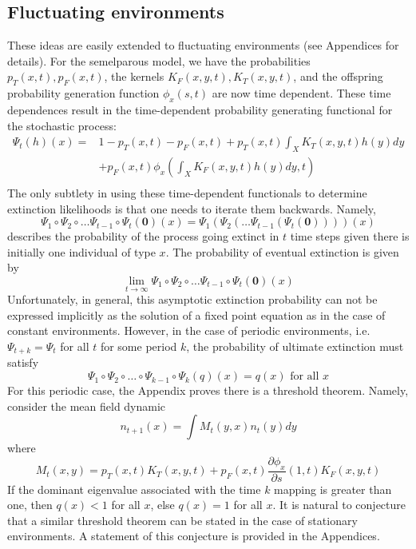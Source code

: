 \documentclass{amsart}
\begin{document}
\subsection*{Fluctuating environments} These ideas are easily extended to fluctuating environments (see Appendices for details). For the semelparous model, we have the probabilities $p_T(x,t),p_F(x,t)$, the kernels $K_F(x,y,t),K_T(x,y,t)$, and the offspring probability generation function $\phi_x(s,t)$ are now time dependent. These time dependences result in the time-dependent probability generating functional for the stochastic process:
\[
\begin{aligned}
\Psi_t(h)(x)
=&1-p_T(x,t)-p_F(x,t)+  p_T(x,t) \int_X K_T(x,y,t) h(y) dy \\ &+ p_F(x,t)\phi_x\left( \int_X K_F(x,y,t) h(y)dy,t\right)\\
\end{aligned}
\]
The only subtlety in using these time-dependent functionals to determine extinction likelihoods is that one needs to iterate them backwards. Namely, 
\[
\Psi_1 \circ \Psi_2 \circ \dots \Psi_{t-1}\circ \Psi_t({\mathbf 0})(x)=\Psi_1\left(\Psi_2 \left( \dots \Psi_{t-1}\left( \Psi_t({\mathbf 0})\right)\right)\right)(x)
\]
describes the probability of the process going extinct in $t$ time steps given there is initially one individual of type $x$. The probability of eventual extinction is given by 
\[
\lim_{t\to\infty} \Psi_1 \circ \Psi_2 \circ \dots \Psi_{t-1}\circ \Psi_t({\mathbf 0})(x)
\]
Unfortunately, in general, this asymptotic extinction probability can not be expressed implicitly as the solution of a fixed point equation as in the case of constant environments. However, in the case of periodic environments, i.e. $\Psi_{t+k}=\Psi_t$ for all $t$ for some period $k$, the probability of ultimate extinction must satisfy
\[
\Psi_1\circ \Psi_2\circ \dots\circ\Psi_{k-1}\circ \Psi_k (q)(x) = q(x) \mbox{ for all }x
\]
For this periodic case, the Appendix proves there is a threshold theorem. Namely, consider the mean field dynamic
\[
n_{t+1}(x)=\int M_t(y,x) n_t(y) dy
\]
where
\[
M_t(x,y)=  p_T(x,t) K_T(x,y,t)  + p_F(x,t)\frac{\partial  \phi_x}{\partial s}(1,t) K_F(x,y,t) 
\]
If the dominant eigenvalue associated with the time $k$ mapping is greater than one, then $q(x)<1$ for all $x$, else $q(x)=1$ for all $x$. It is natural to conjecture that a similar threshold theorem can be stated in the case of stationary environments. A statement of this conjecture is provided in the Appendices. 
\end{document}
